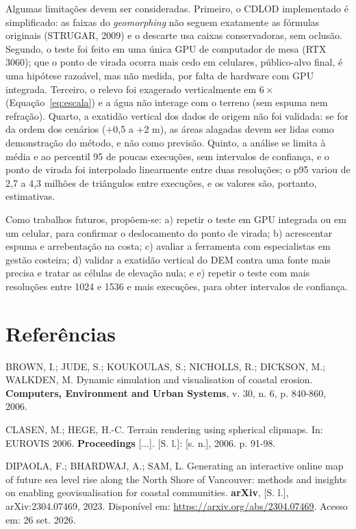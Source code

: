 \documentclass[conference]{IEEEtran}
\begin{document}
Algumas limitações devem ser consideradas. Primeiro, o CDLOD implementado é simplificado: as faixas do \emph{geomorphing} não seguem exatamente as fórmulas originais (STRUGAR, 2009) e o descarte usa caixas conservadoras, sem oclusão. Segundo, o teste foi feito em uma única GPU de computador de mesa (RTX 3060); que o ponto de virada ocorra mais cedo em celulares, público-alvo final, é uma hipótese razoável, mas não medida, por falta de hardware com GPU integrada. Terceiro, o relevo foi exagerado verticalmente em $6\times$ (Equação~\eqref{eq:escala}) e a água não interage com o terreno (sem espuma nem refração). Quarto, a exatidão vertical dos dados de origem não foi validada: se for da ordem dos cenários (+0,5 a +2 m), as áreas alagadas devem ser lidas como demonstração do método, e não como previsão. Quinto, a análise se limita à média e ao percentil 95 de poucas execuções, sem intervalos de confiança, e o ponto de virada foi interpolado linearmente entre duas resoluções; o p95 variou de 2,7 a 4,3 milhões de triângulos entre execuções, e os valores são, portanto, estimativas.

Como trabalhos futuros, propõem-se: a) repetir o teste em GPU integrada ou em um celular, para confirmar o deslocamento do ponto de virada; b) acrescentar espuma e arrebentação na costa; c) avaliar a ferramenta com especialistas em gestão costeira; d) validar a exatidão vertical do DEM contra uma fonte mais precisa e tratar as células de elevação nula; e e) repetir o teste com mais resoluções entre 1024 e 1536 e mais execuções, para obter intervalos de confiança.

\section*{Referências}
\begingroup
\footnotesize
\raggedright
\setlength{\parindent}{0pt}
\setlength{\parskip}{4pt}

BROWN, I.; JUDE, S.; KOUKOULAS, S.; NICHOLLS, R.; DICKSON, M.; WALKDEN,
M. Dynamic simulation and visualisation of coastal erosion. \textbf{Computers,
Environment and Urban Systems}, v. 30, n. 6, p. 840-860, 2006.

CLASEN, M.; HEGE, H.-C. Terrain rendering using spherical clipmaps. In:
EUROVIS 2006. \textbf{Proceedings} [...]. [S. l.]: [s. n.], 2006. p. 91-98.

DIPAOLA, F.; BHARDWAJ, A.; SAM, L. Generating an interactive online map of
future sea level rise along the North Shore of Vancouver: methods and
insights on enabling geovisualisation for coastal communities. \textbf{arXiv},
[S. l.], arXiv:2304.07469, 2023. Disponível em:
\url{https://arxiv.org/abs/2304.07469}. Acesso em: 26 set. 2026.
\end{document}
